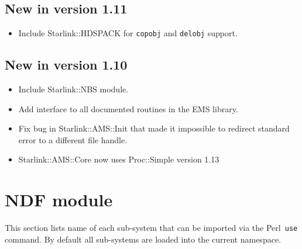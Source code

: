 \documentclass[twoside,11pt]{article}
\newcommand{\perl}{\xref{\textsf{Perl}}{sun193}{}}
\newcommand{\xref}[3]{#1}
\renewcommand{\_}{\texttt{\symbol{95}}}
\begin{document}
\subsection{New in version 1.11}

\begin{itemize}
\item Include Starlink::HDSPACK for \texttt{copobj} and \texttt{delobj}
support.

\end{itemize}

\subsection{New in version 1.10}

\begin{itemize}
\item Include Starlink::NBS module.
\item Add interface to all documented routines in the EMS library.
\item Fix bug in Starlink::AMS::Init that made it impossible to redirect
standard error to a different file handle.
\item Starlink::AMS::Core now uses Proc::Simple version 1.13
\end{itemize}


\section{NDF module\label{ndfapp}}

This section lists name of each sub-system that can be imported via the 
\perl\ \texttt{use} command. By default all sub-systems are loaded into the
current namespace.
\end{document}
